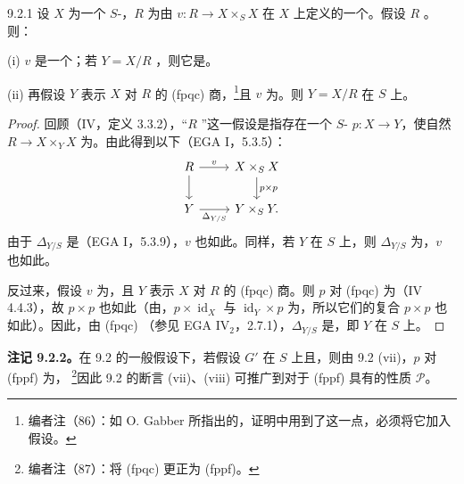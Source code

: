 \begin{SGAresult}{}{9.2.1}
设 $X$ 为一个 $S$-，$R$ 为由 $v:R\to X\times_S X$ 在 $X$ 上定义的一个。假设 $R$ 。则：

(i) $v$ 是一个；若 $Y=X/R$ ，则它是。

(ii) 再假设 $Y$ 表示 $X$ 对 $R$ 的 (fpqc) 商，\footnote{编者注（86）：如 O. Gabber 所指出的，证明中用到了这一点，必须将它加入假设。}且 $v$ 为。则 $Y=X/R$ 在 $S$ 上。
\end{SGAresult}
\begin{proof}
回顾（IV，定义 3.3.2），“$R$ ”这一假设是指存在一个 $S$- $p:X\to Y$，使自然 $R\to X\times_Y X$ 为。由此得到以下（EGA I，5.3.5）：
\[
\begin{tikzcd}
R\arrow[r,"v"]\arrow[d]&X\times_S X\arrow[d,"p\times p"]\\
Y\arrow[r,"\Delta_{Y/S}"']&Y\times_S Y.
\end{tikzcd}
\]
由于 $\Delta_{Y/S}$ 是（EGA I，5.3.9），$v$ 也如此。同样，若 $Y$ 在 $S$ 上，则 $\Delta_{Y/S}$ 为，$v$ 也如此。

反过来，假设 $v$ 为，且 $Y$ 表示 $X$ 对 $R$ 的 (fpqc) 商。则 $p$ 对 (fpqc) 为（IV 4.4.3），故 $p\times p$ 也如此（由，$p\times\operatorname{id}_X$ 与 $\operatorname{id}_Y\times p$ 为，所以它们的复合 $p\times p$ 也如此）。因此，由 (fpqc) （参见 EGA $\mathrm{IV}_2$，2.7.1），$\Delta_{Y/S}$ 是，即 $Y$ 在 $S$ 上。
\end{proof}

\textbf{注记 9.2.2。}在 9.2 的一般假设下，若假设 $G'$ 在 $S$ 上且，则由 9.2 (vii)，$p$ 对 (fppf) 为，
\footnote{编者注（87）：将 (fpqc) 更正为 (fppf)。}因此 9.2 的断言 (vii)、(viii) 可推广到对于 (fppf) 具有的性质 $\mathscr P$。

